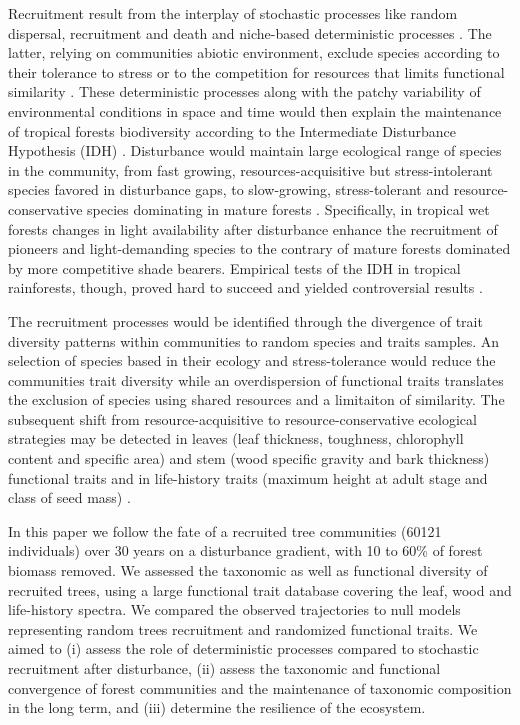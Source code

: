 \documentclass[fleqn,10pt]{ArtEcoFoG} %
\begin{document}
Recruitment result from the interplay of stochastic processes like
random dispersal, recruitment and death \citep{Hubbell2001} and
niche-based deterministic processes \citep{Adler2005}. The latter,
relying on communities abiotic environment, exclude species according to
their tolerance to stress or to the competition for resources that
limits functional similarity \citep{Ackerly2003, McGill2006}. These
deterministic processes along with the patchy variability of
environmental conditions in space and time would then explain the
maintenance of tropical forests biodiversity according to the
Intermediate Disturbance Hypothesis (IDH) \citep{Guitet2018}.
Disturbance would maintain large ecological range of species in the
community, from fast growing, resources-acquisitive but
stress-intolerant species favored in disturbance gaps, to slow-growing,
stress-tolerant and resource-conservative species dominating in mature
forests \citep{Denslow1980, Molino2001, Bongers2009}. Specifically, in
tropical wet forests changes in light availability after disturbance
enhance the recruitment of pioneers and light-demanding species to the
contrary of mature forests dominated by more competitive shade bearers.
Empirical tests of the IDH in tropical rainforests, though, proved hard
to succeed and yielded controversial results
\citep{Hubbell1999, Molino2001, Sheil2003}.

The recruitment processes would be identified through the divergence of
trait diversity patterns within communities to random species and traits
samples. An selection of species based in their ecology and
stress-tolerance would reduce the communities trait diversity while an
overdispersion of functional traits translates the exclusion of species
using shared resources and a limitaiton of similarity. The subsequent
shift from resource-acquisitive to resource-conservative ecological
strategies may be detected in leaves (leaf thickness, toughness,
chlorophyll content and specific area) and stem (wood specific gravity
and bark thickness) functional traits and in life-history traits
(maximum height at adult stage and class of seed mass)
\citep{Wright2004, Chave2009b, Herault2011}.

In this paper we follow the fate of a recruited tree communities (60121
individuals) over 30 years on a disturbance gradient, with 10 to 60\% of
forest biomass removed. We assessed the taxonomic as well as functional
diversity of recruited trees, using a large functional trait database
covering the leaf, wood and life-history spectra. We compared the
observed trajectories to null models representing random trees
recruitment and randomized functional traits. We aimed to (i) assess the
role of deterministic processes compared to stochastic recruitment after
disturbance, (ii) assess the taxonomic and functional convergence of
forest communities and the maintenance of taxonomic composition in the
long term, and (iii) determine the resilience of the ecosystem.
\end{document}
